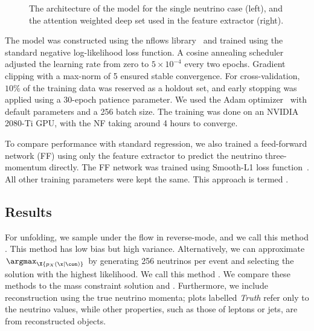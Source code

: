 \begin{figure}[ht]
    \centering
    \caption{The architecture of the \vflows model for the single neutrino case (left), and the attention weighted deep set used in the feature extractor (right).}
    \label{fig:flow}
\end{figure}

The model was constructed using the nflows library~\cite{nflows} and trained using the standard negative log-likelihood loss function.
A cosine annealing scheduler adjusted the learning rate from zero to $5\times 10^{-4}$ every two epochs.
Gradient clipping with a max-norm of 5 ensured stable convergence.
For cross-validation, $10\%$ of the training data was reserved as a holdout set, and early stopping was applied using a 30-epoch patience parameter.
We used the Adam optimizer~\cite{Adam} with default parameters and a 256 batch size.
The training was done on an NVIDIA 2080-Ti GPU, with the NF taking around 4 hours to converge.

To compare performance with standard regression, we also trained a feed-forward network (FF) using only the feature extractor to predict the neutrino three-momentum directly.
The FF network was trained using Smooth-L1 loss function~\cite{SmoothL1}.
All other training parameters were kept the same.
This approach is termed \vff.

\subsection{Results}

For unfolding, we sample under the flow in reverse-mode, and we call this method \vsample.
This method has low bias but high variance.
Alternatively, we can approximate $\argmax_\X{p_X(\x|\con)}$ by generating 256 neutrinos per event and selecting the solution with the highest likelihood.
We call this method \vmode.
We compare these methods to the mass constraint solution and \vff.
Furthermore, we include reconstruction using the true neutrino momenta; plots labelled \emph{Truth} refer only to the neutrino values, while other properties, such as those of leptons or jets, are from reconstructed objects.


